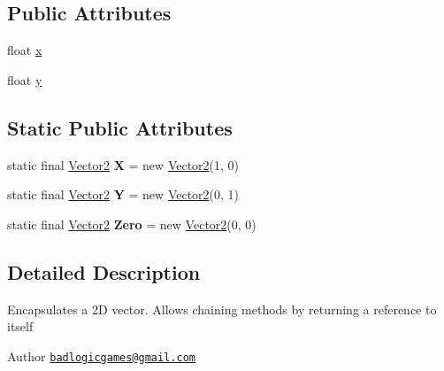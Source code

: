\subsection*{Public Attributes}
\begin{DoxyCompactItemize}
\item 
float \hyperlink{classairhockeyjava_1_1util_1_1_vector2_a5cb47d6c109d38c9cd59608e9c94c2e3}{x}
\item 
float \hyperlink{classairhockeyjava_1_1util_1_1_vector2_a298d8ff99b5daf0854ecf879b3031ecd}{y}
\end{DoxyCompactItemize}
\subsection*{Static Public Attributes}
\begin{DoxyCompactItemize}
\item 
\hypertarget{classairhockeyjava_1_1util_1_1_vector2_abce4677a1fd5fa63e827e9791157cb1d}{}static final \hyperlink{classairhockeyjava_1_1util_1_1_vector2}{Vector2} {\bfseries X} = new \hyperlink{classairhockeyjava_1_1util_1_1_vector2}{Vector2}(1, 0)\label{classairhockeyjava_1_1util_1_1_vector2_abce4677a1fd5fa63e827e9791157cb1d}

\item 
\hypertarget{classairhockeyjava_1_1util_1_1_vector2_ae85c456cb3189c864bc9f3dfbea004d6}{}static final \hyperlink{classairhockeyjava_1_1util_1_1_vector2}{Vector2} {\bfseries Y} = new \hyperlink{classairhockeyjava_1_1util_1_1_vector2}{Vector2}(0, 1)\label{classairhockeyjava_1_1util_1_1_vector2_ae85c456cb3189c864bc9f3dfbea004d6}

\item 
\hypertarget{classairhockeyjava_1_1util_1_1_vector2_a469c81d36e5729a7be5d408a36938d4d}{}static final \hyperlink{classairhockeyjava_1_1util_1_1_vector2}{Vector2} {\bfseries Zero} = new \hyperlink{classairhockeyjava_1_1util_1_1_vector2}{Vector2}(0, 0)\label{classairhockeyjava_1_1util_1_1_vector2_a469c81d36e5729a7be5d408a36938d4d}

\end{DoxyCompactItemize}


\subsection{Detailed Description}
Encapsulates a 2\+D vector. Allows chaining methods by returning a reference to itself \begin{DoxyAuthor}{Author}
\href{mailto:badlogicgames@gmail.com}{\tt badlogicgames@gmail.\+com} 
\end{DoxyAuthor}



